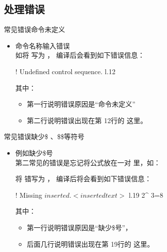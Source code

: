 \documentclass[fontset = none, xcolor=svgnames, t, aspectratio=169]{ctexbeamer}
\begin{document}
\subsection{处理错误}
\begin{frame}[t, fragile]{常见错误}{命令未定义}
  \stretchon
  \begin{itemize}
  \item 命令名称\alert{输入}错误\\[3ex]
  
  
  如将  写为 ，
  编译后会看到如下错误信息：
  \begin{texcode}
    ! Undefined control sequence.
    l.12 \authos
  \end{texcode}
  其中：
  \begin{itemize}
  \item 第一行说明错误原因是“命令未定义”
  \item 第二行说明错误出现在第 12行的 \texinline{\authos} 这里。
  \end{itemize}
  
  \end{itemize}
  \stretchoff
\end{frame}

\begin{frame}[t, fragile]{常见错误}{缺少\$ 、\$\$等符号}
  \stretchon
  \begin{itemize}
  \item 例如缺少\$号\\[3ex]
  
  
    第二常见的错误是忘记将公式放在一对\qtmark{\$} 里，如：

    将  错写为 ，
  编译后将会看到如下错误信息：
  \begin{texcode}
    ! Missing $ inserted.
    <inserted text>
                    $
    l.19 2^
           3=8
  \end{texcode}
  其中：
  \begin{itemize}
  \item 第一行说明错误原因是“缺少\$号”，
  \item 后面几行说明错误出现在第 19行的  这里。
  \end{itemize}
  
  \end{itemize}
  \stretchoff
\end{frame}
\end{document}

